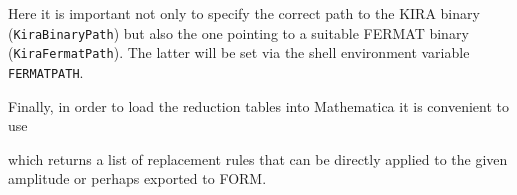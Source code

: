 \documentclass[../FeynHelpersManual.tex]{subfiles}
\begin{document}
Here it is important not only to specify the correct path to the KIRA
binary (\texttt{KiraBinaryPath}) but also the one pointing to a suitable
FERMAT binary (\texttt{KiraFermatPath}). The latter will be set via the
shell environment variable \texttt{FERMATPATH}.

Finally, in order to load the reduction tables into Mathematica it is
convenient to use

\begin{Shaded}
\begin{Highlighting}[]
\ExtensionTok{=}\OperatorTok{[}\OperatorTok{,} \OperatorTok{[]]}
\end{Highlighting}
\end{Shaded}

which returns a list of replacement rules that can be directly applied
to the given amplitude or perhaps exported to FORM.
\end{document}
